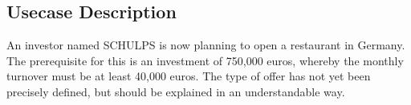 \subsection{Usecase Description}
\label{subsec:usecase}
An investor named SCHULPS is now planning to open a restaurant in Germany. The prerequisite for this is an investment of 750,000 euros, whereby the monthly turnover must be at least 40,000 euros. The type of offer has not yet been precisely defined, but should be explained in an understandable way.